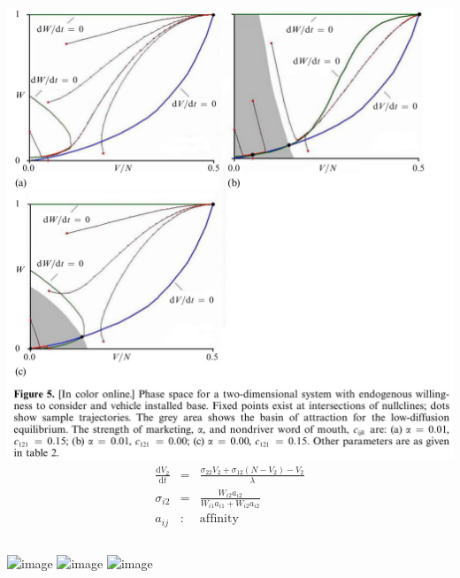 \documentclass{beamer}
\begin{document}
\begin{frame}
  \begin{columns}
    \includegraphics[width=\textwidth]{Sterman-fig-5.jpg}
    \begin{eqnarray*}
      \frac{\mathrm{d}V_{2}}{\mathrm{d}t}&=&\frac{\sigma_{22}V_2+\sigma_{12}(N-V_2)-V_2}{\lambda}\\
      \sigma_{i2}&=& \frac{W_{i2}a_{i2}}{W_{i1}a_{i1}+W_{i2}a_{i2}}\\
      a_{ij}&:&\textrm{affinity}
    \end{eqnarray*}
  \end{columns}
\end{frame}
    

\begin{frame}
  \includegraphics<+>[width=\textwidth]{Sterman-fig-6a.jpg}
  \includegraphics<+>[width=\textwidth]{Sterman-fig-6b.jpg}
  \includegraphics<+>[width=\textwidth]{Sterman-fig-6c.jpg}
\end{frame}
\end{document}

